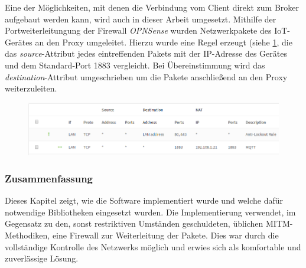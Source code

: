     Eine der Möglichkeiten, mit denen die Verbindung vom Client direkt zum Broker aufgebaut werden kann, wird auch in dieser Arbeit umgesetzt.
    Mithilfe der Portweiterleitungung der Firewall \emph{OPNSense} wurden Netzwerkpakete des \ac{IoT}-Gerätes an den Proxy umgeleitet. Hierzu wurde eine Regel erzeugt (siehe \ref{fig:firewall_rule}, die das \emph{source}-Attribut jedes eintreffenden Pakets mit der IP-Adresse des Gerätes und dem Standard-Port 1883 vergleicht. Bei Übereinstimmung wird das \emph{destination}-Attribut umgeschrieben um die Pakete anschließend an den Proxy weiterzuleiten.
    \begin{figure}[h]%
        \centering
        \includegraphics[width=14cm]{tex/bilder/5_implementierung/firewall.PNG}
        \label{fig:firewall_rule}
    \end{figure}
    
\subsubsection{Zusammenfassung}
    Dieses Kapitel zeigt, wie die Software implementiert wurde und welche dafür notwendige Bibliotheken eingesetzt wurden. Die Implementierung verwendet, im Gegensatz zu den, sonst restriktiven Umständen geschuldeten, üblichen \ac{MITM}-Methodiken, eine Firewall zur Weiterleitung der Pakete. Dies war durch die vollständige Kontrolle des Netzwerks möglich und erwies sich als komfortable und zuverlässige Lösung.